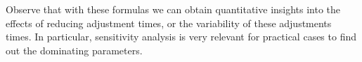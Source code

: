 Observe that with these formulas we can obtain quantitative insights into the effects of reducing adjustment times, or the variability of these adjustments times. In particular, sensitivity analysis is very relevant for practical cases to find out the dominating parameters. 



\begin{comment}

\begin{exercise}
Zijm.Ex.1.11.6
 \begin{solution}
   Cleaning times will be pretty constant. Changing dies, or other
   machine parts, is also typically quite predictable, although it can
   take a lot of time, in particular in case a crane or other heavy
   machinery is needed to replace parts. If the machine require
   temporary adjustments, then the variation in setup times may be
   quite a bit higher.
\end{solution}
\end{exercise}

\begin{exercise}
Zijm.Ex.1.11.7
 \begin{solution}
   Then the effective service times, and in particular, $C_e^2$ will
   be quite a bit bigger. It is preferable to avoid such a situation. 

   Mathematically, it is only given that $N_s$ is a random
   variable. As, however, this does not state anything about its
   distribution, we cannot make any general claim. The intent of the
   problem is to have you check the relevant formulas and notice that
   the variance of $N_s$ appears in the formulas.
\end{solution}
\end{exercise}


  
\end{comment}




